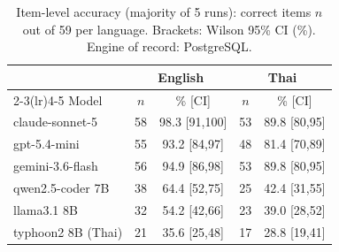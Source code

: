 \begin{table}[t]
\caption{Item-level accuracy (majority of 5 runs): correct items $n$
out of 59 per language. Brackets: Wilson 95\% CI (\%). Engine of
record: PostgreSQL.}
\label{tab:headline}
\centering\footnotesize\setlength{\tabcolsep}{3.5pt}
\begin{tabular}{lcccc}
\toprule
 & \multicolumn{2}{c}{English} & \multicolumn{2}{c}{Thai} \\
\cmidrule(lr){2-3}\cmidrule(lr){4-5}
Model & $n$ & \% [CI] & $n$ & \% [CI] \\
\midrule
claude-sonnet-5 & 58 & 98.3 [91,100] & 53 & 89.8 [80,95] \\
gpt-5.4-mini & 55 & 93.2 [84,97] & 48 & 81.4 [70,89] \\
gemini-3.6-flash & 56 & 94.9 [86,98] & 53 & 89.8 [80,95] \\
qwen2.5-coder 7B & 38 & 64.4 [52,75] & 25 & 42.4 [31,55] \\
llama3.1 8B & 32 & 54.2 [42,66] & 23 & 39.0 [28,52] \\
typhoon2 8B (Thai) & 21 & 35.6 [25,48] & 17 & 28.8 [19,41] \\
\bottomrule
\end{tabular}
\end{table}
